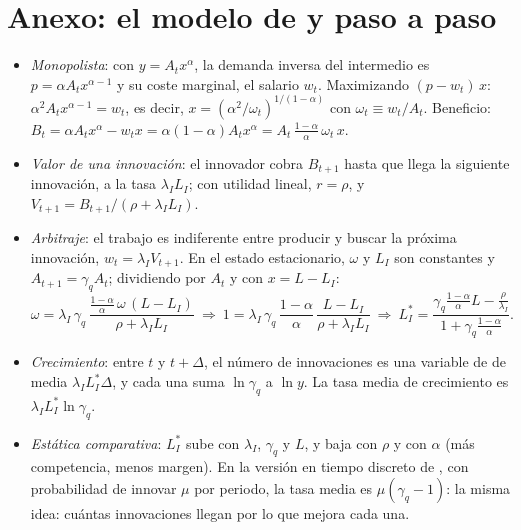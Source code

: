 \documentclass[11pt]{article}
\begin{document}
\section{Anexo: el modelo de  y  paso a paso}\label{anexo:aghion-howitt}

\begin{itemize}
\item \emph{Monopolista}: con $y=A_tx^{\alpha}$, la demanda inversa del intermedio es $p=\alpha A_tx^{\alpha-1}$ y su coste marginal, el salario $w_t$. Maximizando $(p-w_t)\,x$: $\alpha^2A_tx^{\alpha-1}=w_t$, es decir, $x=(\alpha^2/\omega_t)^{1/(1-\alpha)}$ con $\omega_t\equiv w_t/A_t$. Beneficio: $B_t=\alpha A_tx^{\alpha}-w_tx=\alpha(1-\alpha)A_tx^{\alpha}=A_t\,\frac{1-\alpha}{\alpha}\,\omega_t\,x$.
\item \emph{Valor de una innovación}: el innovador cobra $B_{t+1}$ hasta que llega la siguiente innovación, a la tasa $\lambda_IL_I$; con utilidad lineal, $r=\rho$, y $V_{t+1}=B_{t+1}/(\rho+\lambda_IL_I)$.
\item \emph{Arbitraje}: el trabajo es indiferente entre producir y buscar la próxima innovación, $w_t=\lambda_IV_{t+1}$. En el estado estacionario, $\omega$ y $L_I$ son constantes y $A_{t+1}=\gamma_qA_t$; dividiendo por $A_t$ y con $x=L-L_I$:
  \[\omega=\lambda_I\,\gamma_q\,\frac{\frac{1-\alpha}{\alpha}\,\omega\,(L-L_I)}{\rho+\lambda_IL_I}\ \Longrightarrow\ 1=\lambda_I\,\gamma_q\,\frac{1-\alpha}{\alpha}\,\frac{L-L_I}{\rho+\lambda_IL_I}\ \Longrightarrow\ L_I^*=\frac{\gamma_q\frac{1-\alpha}{\alpha}L-\frac{\rho}{\lambda_I}}{1+\gamma_q\frac{1-\alpha}{\alpha}}.\]
\item \emph{Crecimiento}: entre $t$ y $t+\Delta$, el número de innovaciones es una variable de  de media $\lambda_IL_I^*\Delta$, y cada una suma $\ln\gamma_q$ a $\ln y$. La tasa media de crecimiento es $\lambda_IL_I^*\ln\gamma_q$. \findemo
\item \emph{Estática comparativa}: $L_I^*$ sube con $\lambda_I$, $\gamma_q$ y $L$, y baja con $\rho$ y con $\alpha$ (más competencia, menos margen). En la versión en tiempo discreto de \textcite[cap.~4]{AghionHowitt2009}, con probabilidad de innovar $\mu$ por periodo, la tasa media es $\mu(\gamma_q-1)$: la misma idea: cuántas innovaciones llegan por lo que mejora cada una.
\end{itemize}

\end{document}
